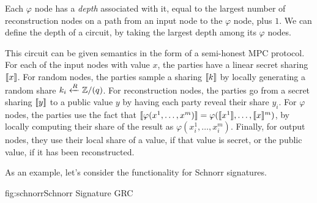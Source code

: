 Each $\varphi$ node has a \emph{depth} associated with it, equal
to the largest number of reconstruction nodes on a path from an input
node to the $\varphi$ node, plus $1$.
We can define the depth of a circuit, by taking the largest depth
among its $\varphi$ nodes.

This circuit can be given semantics in the form of a semi-honest MPC protocol.
For each of the input nodes with value $x$, the parties have a linear
secret sharing $\llbracket x\rrbracket$. For random nodes, the parties sample
a sharing $\llbracket k\rrbracket$ by locally generating a random share $k_i \xleftarrow{R} \mathbb{Z}/(q)$.
For reconstruction nodes, the parties go from a secret sharing $\llbracket y\rrbracket$
to a public value $y$ by having each party reveal their share $y_i$.
For $\varphi$ nodes, the parties use the fact that
$\llbracket\varphi(x^1, \ldots, x^m)\rrbracket = \varphi(\llbracket x^1\rrbracket, \ldots, \llbracket x\rrbracket^m)$,
by locally computing their share of the result as $\varphi(x^1_i, \ldots, x^m_i)$.
Finally, for output nodes, they use their local share of a value, if that
value is secret, or the public value, if it has been reconstructed. 

As an example, let's consider the functionality for Schnorr signatures.

\begin{afigure}{fig:schnorr}{Schnorr Signature GRC}
\end{afigure}

